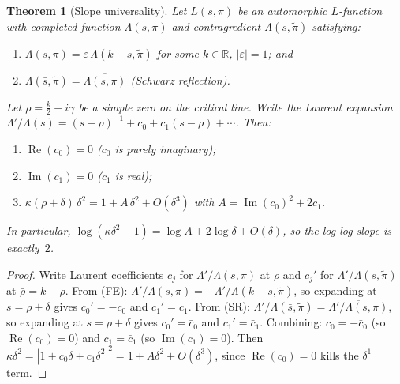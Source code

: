 \documentclass[11pt, a4paper]{article}
\theoremstyle{plain}
\newtheorem{theorem}{Theorem}
\theoremstyle{definition}
\begin{document}
\begin{theorem}[Slope universality]
\label{thm:slopeuniv}
  Let $L(s,\pi)$ be an automorphic $L$-function with completed function
  $\Lambda(s,\pi)$ and contragredient $\Lambda(s,\tilde\pi)$ satisfying:
  \begin{enumerate}
    \item[\textup{(FE)}] $\Lambda(s,\pi) = \varepsilon\,\Lambda(k-s,\tilde\pi)$
          for some $k\in\mathbb{R}$, $|\varepsilon|=1$; and
    \item[\textup{(SR)}] $\Lambda(\bar{s},\tilde\pi) = \overline{\Lambda(s,\pi)}$
          \textup{(}Schwarz reflection\textup{)}.
  \end{enumerate}
  Let $\rho=\tfrac{k}{2}+i\gamma$ be a simple zero on the critical line.
  Write the Laurent expansion
  $\Lambda'/\Lambda(s) = (s-\rho)^{-1} + c_0 + c_1(s-\rho) + \cdots$.
  Then:
  \begin{enumerate}
    \item[\textup{(i)}] $\operatorname{Re}(c_0)=0$ \textup{(}$c_0$ is purely imaginary\textup{)};
    \item[\textup{(ii)}] $\operatorname{Im}(c_1)=0$ \textup{(}$c_1$ is real\textup{)};
    \item[\textup{(iii)}] $\kappa(\rho{+}\delta)\,\delta^{2}
          = 1 + A\,\delta^{2} + O(\delta^{3})$
          with $A = \operatorname{Im}(c_0)^{2} + 2c_1$.
  \end{enumerate}
  In particular, $\log(\kappa\delta^{2}-1) = \log A + 2\log\delta + O(\delta)$,
  so the log-log slope is exactly~$2$.
\end{theorem}

\begin{proof}
  Write Laurent coefficients $c_j$ for $\Lambda'/\Lambda(s,\pi)$ at $\rho$
  and $c_j'$ for $\Lambda'/\Lambda(s,\tilde\pi)$ at $\bar\rho=k-\rho$.
  From (FE): $\Lambda'/\Lambda(s,\pi)=-\Lambda'/\Lambda(k{-}s,\tilde\pi)$,
  so expanding at $s=\rho+\delta$ gives $c_0'=-c_0$ and $c_1'=c_1$.
  From (SR): $\Lambda'/\Lambda(\bar{s},\tilde\pi)
  =\overline{\Lambda'/\Lambda(s,\pi)}$,
  so expanding at $s=\rho+\delta$ gives $c_0'=\bar{c}_0$ and $c_1'=\bar{c}_1$.
  Combining: $c_0=-\bar{c}_0$ (so $\operatorname{Re}(c_0)=0$)
  and $c_1=\bar{c}_1$ (so $\operatorname{Im}(c_1)=0$).
  Then $\kappa\delta^{2}=|1+c_0\delta+c_1\delta^2|^2
  =1+A\delta^2+O(\delta^3)$,
  since $\operatorname{Re}(c_0)=0$ kills the $\delta^1$ term.
\end{proof}
\end{document}
